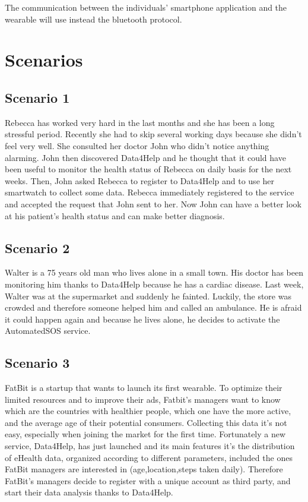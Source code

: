 The communication between the individuals' smartphone application and the wearable will use instead the bluetooth protocol.

\section{Scenarios}
\subsection{Scenario 1}

Rebecca has worked very hard in the last months and she has been a long stressful period. Recently she had to skip several working days because she didn't feel very well. 
She consulted her doctor John who didn't notice anything alarming.
John then discovered Data4Help and he thought that it could have been useful to monitor the health status of Rebecca on daily basis for the next weeks.
Then, John asked Rebecca to register to Data4Help and to use her smartwatch to collect some data.
Rebecca immediately registered to the service and accepted the request that John sent to her.
Now John can have a better look at his patient's health status and can make better diagnosis.


\subsection{Scenario 2}
Walter is a 75 years old man who lives alone in a small town.
His doctor has been monitoring him thanks to Data4Help because he has a cardiac disease.
Last week, Walter was at the supermarket and suddenly he fainted. Luckily, the store was crowded and therefore someone helped him and called an ambulance.
He is afraid it could happen again and because he lives alone, he decides to activate the AutomatedSOS service.


\subsection{Scenario 3}
FatBit is a startup that wants to launch its first wearable. To optimize their limited resources and to improve their ads, Fatbit's managers want to know which are the countries with healthier people, which one have the more active, and the average age of their potential consumers. Collecting this data it's not easy, especially when joining the market for the first time. Fortunately a new service, Data4Help, has just launched and its main features it's the distribution of eHealth data, organized according to different parameters, included the ones FatBit managers are interested in (age,location,steps taken daily).
Therefore FatBit's managers decide to register with a unique account as third party, and start their data analysis thanks to Data4Help.


